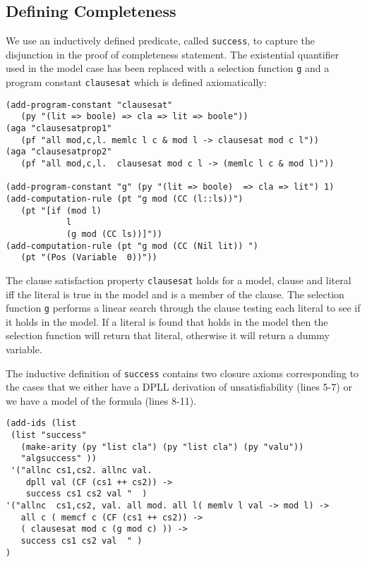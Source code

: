\subsection*{Defining Completeness}

We use an inductively defined predicate, called \texttt{success}, to capture the disjunction in the proof of completeness statement. The existential quantifier used in the model case has been replaced with a selection function \texttt{g} and a program constant \texttt{clausesat} which is defined axiomatically:

\begin{lstlisting}[caption = The clause satisfaction property and satisfying literal selection function]
(add-program-constant "clausesat" 
   (py "(lit => boole) => cla => lit => boole"))
(aga "clausesatprop1" 
   (pf "all mod,c,l. memlc l c & mod l -> clausesat mod c l"))
(aga "clausesatprop2" 
   (pf "all mod,c,l.  clausesat mod c l -> (memlc l c & mod l)"))

(add-program-constant "g" (py "(lit => boole)  => cla => lit") 1)
(add-computation-rule (pt "g mod (CC (l::ls))") 
   (pt "[if (mod l)                                                                                       
            l                                                                                     
            (g mod (CC ls))]"))
(add-computation-rule (pt "g mod (CC (Nil lit)) ") 
   (pt "(Pos (Variable  0))"))
\end{lstlisting}

The clause satisfaction property \texttt{clausesat} holds for a model, clause and literal iff the literal is true in the model and is a member of the clause. The selection function \texttt{g} performs a linear search through the clause testing each literal to see if it holds in the model. If a literal is found that holds in the model then the selection function will return that literal, otherwise it will return a dummy variable. 

The inductive definition of \texttt{success} contains two closure axioms corresponding to the cases that we either have a DPLL derivation of unsatisfiability (lines 5-7) or we have a model of the formula (lines 8-11). 

\begin{lstlisting}[caption = "Inductive Definition of Completeness"]
(add-ids (list 
 (list "success" 
   (make-arity (py "list cla") (py "list cla") (py "valu"))
   "algsuccess" ))
 '("allnc cs1,cs2. allnc val.                                                                                                                
    dpll val (CF (cs1 ++ cs2)) ->                                                                                        
    success cs1 cs2 val "  )
'("allnc  cs1,cs2, val. all mod. all l( memlv l val -> mod l) ->                                                                      
   all c ( memcf c (CF (cs1 ++ cs2)) ->  
   ( clausesat mod c (g mod c) )) ->                                
   success cs1 cs2 val  " )
)
\end{lstlisting}


